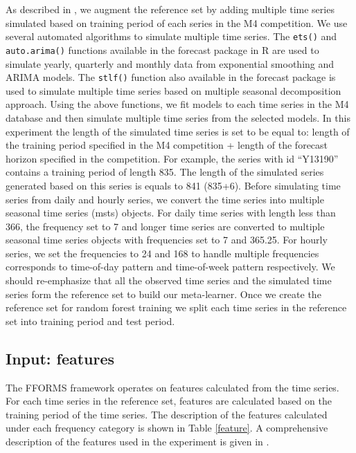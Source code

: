 \documentclass[11pt,a4paper,]{article}
\begin{document}
As described in \textcite{fforms}, we augment the reference set by adding multiple time series simulated based on training period of each series in the M4 competition. We use several automated algorithms to simulate multiple time series. The \texttt{ets()} and \texttt{auto.arima()} functions available in the forecast package in R \autocite{forecast} are used to simulate yearly, quarterly and monthly data from exponential smoothing and ARIMA models. The \texttt{stlf()} function also available in the forecast package is used to simulate multiple time series based on multiple seasonal decomposition approach. Using the above functions, we fit models to each time series in the M4 database and then simulate multiple time series from the selected models. In this experiment the length of the simulated time series is set to be equal to: length of the training
period specified in the M4 competition + length of the forecast horizon specified in the competition. For example, the series with id ``Y13190'' contains a training period of length 835. The length of the simulated series generated based on this series is equals to 841 (835+6). Before simulating time series from daily and hourly series, we convert the time series into multiple seasonal time series (msts) objects. For daily time series with length less than 366, the frequency set to 7 and longer time series are converted to multiple seasonal time series objects with frequencies set to 7 and 365.25. For hourly series, we set the frequencies to 24 and 168 to handle multiple frequencies corresponds to time-of-day pattern and time-of-week pattern respectively. We should re-emphasize that all the observed time series and the simulated time series form the reference set to build our meta-learner. Once we create the reference set for random forest training we split each time series in the reference set into training period and test period.

\hypertarget{input-features}{%
\subsection{Input: features}\label{input-features}}

The FFORMS framework operates on features calculated from the time series. For each time series in the reference set, features are calculated based on the training period of the time series. The description of the features calculated under each frequency category is shown in Table \ref{feature}. A comprehensive description of the features used in the experiment is given in \textcite{fforms}.
\end{document}
